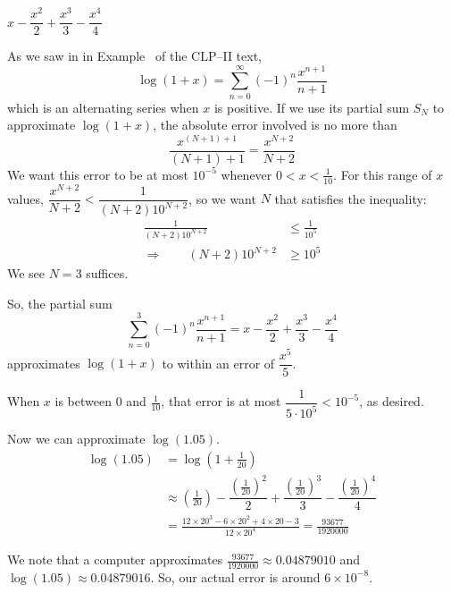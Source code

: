 \begin{answer}
$x-\dfrac{x^2}{2}+\dfrac{x^3}{3}-\dfrac{x^4}{4}$
\end{answer}
\begin{solution}
As we saw in in Example~  of the CLP--II text,
\[\log(1+ x) = \sum_{n=0}^\infty (-1)^n\frac{x^{n+1}}{n+1}\]
which is an alternating series when $x$ is positive. If we use its partial sum $S_N$ to approximate $\log(1+ x)$, the absolute error involved is no more than
 \[\frac{x^{(N+1)+1}}{(N+1)+1} =\frac{x^{N+2}}{N+2}\]
 We want this error to be at most $10^{-5}$ whenever $0< x <\frac1{10}$. For this range of $x$ values,
$ \dfrac{x^{N+2}}{N+2}<\dfrac{1}{(N+2)10^{N+2}}$, so we want $N$ that satisfies the  inequality:
\begin{align*}
\frac{1}{(N+2)10^{N+2}}&\le \frac{1}{10^5}\\
\Rightarrow \qquad (N+2)10^{N+2}&\ge 10^5
\end{align*}
We see $N=3$ suffices.

So, the partial sum
\[ \sum_{n=0}^3 (-1)^n\frac{x^{n+1}}{n+1}=x-\frac{x^2}{2}+\frac{x^3}{3}-\frac{x^4}{4}\]
approximates $\log(1+x)$ to within an error of
$\dfrac{x^5}{5}$.

When $x$ is between $0$ and $\frac1{10}$,
that error is at most $\dfrac{1}{5\cdot 10^5}<10^{-5}$, as desired.

Now we can approximate $\log(1.05)$.
\begin{align*}
\log(1.05)&=\log\left(1+\frac{1}{20}\right)\\
&\approx \left(\tfrac{1}{20}\right)-\dfrac{\left(\tfrac{1}{20}\right)^2}{2}+\dfrac{\left(\tfrac{1}{20}\right)^3}{3}-\dfrac{\left(\tfrac{1}{20}\right)^4}{4}\\
&=\frac{12\times 20^3-6\times 20^2+4\times 20-3}{12\times 20^4}=\frac{93677}{1920000}
\end{align*}

We note that a computer approximates
$\frac{93677}{1920000}\approx0.04879010$ and
$\log(1.05) \approx 0.04879016$. So, our actual error is around $6\times 10^{-8}$.
\end{solution}

